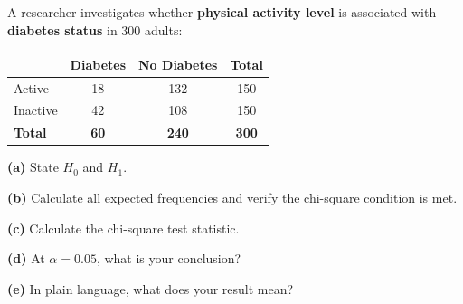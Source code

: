 \documentclass[
  12pt,
  letterpaper,
]{book}
\newcounter{none} %
\begin{document}
\begin{tcolorbox}[enhanced jigsaw, arc=.35mm, bottomrule=.15mm, bottomtitle=1mm, breakable, colback=white, colbacktitle=quarto-callout-caution-color!10!white, colframe=quarto-callout-caution-color-frame, coltitle=black, left=2mm, leftrule=.75mm, opacityback=0, opacitybacktitle=0.6, rightrule=.15mm, title={✏️ Exercise 1 --- Chi-Square Test}, titlerule=0mm, toprule=.15mm, toptitle=1mm]

A researcher investigates whether \textbf{physical activity level} is
associated with \textbf{diabetes status} in 300 adults:

{\def\LTcaptype{none} %
\begin{longtable}[]{@{}lccc@{}}
\toprule\noalign{}
& Diabetes & No Diabetes & Total \\
\midrule\noalign{}
\endhead
\bottomrule\noalign{}
\endlastfoot
Active & 18 & 132 & 150 \\
Inactive & 42 & 108 & 150 \\
\textbf{Total} & \textbf{60} & \textbf{240} & \textbf{300} \\
\end{longtable}
}

\textbf{(a)} State \(H_0\) and \(H_1\).

\textbf{(b)} Calculate all expected frequencies and verify the
chi-square condition is met.

\textbf{(c)} Calculate the chi-square test statistic.

\textbf{(d)} At \(\alpha = 0.05\), what is your conclusion?

\textbf{(e)} In plain language, what does your result mean?

\end{tcolorbox}
\end{document}
